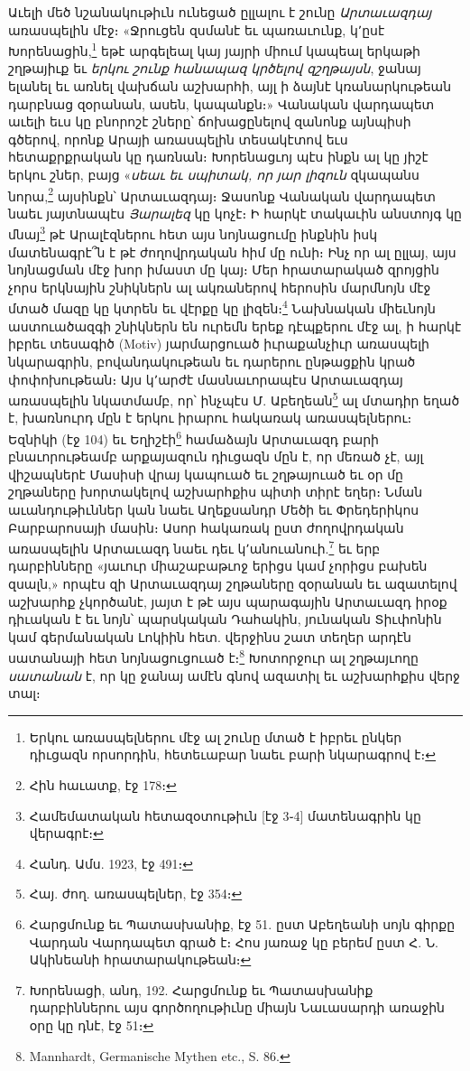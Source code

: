 \documentclass{article}
\begin{document}
{Աւելի մեծ նշանակութիւն ունեցած ըլլալու է շունը \emph{Արտաւազդայ} առասպելին մէջ։ «Ջրուցեն զսմանէ եւ պառաւունք, կ՚ըսէ Խորենացին,\footnote{Երկու առասպելներու մէջ ալ շունը մտած է իբրեւ ընկեր դիւցազն որսորդին, հետեւաբար նաեւ բարի նկարագրով է։} եթէ արգելեալ կայ յայրի միում կապեալ երկաթի շղթայիւք եւ \emph{երկու շունք հանապազ կրծելով զշղթայսն}, ջանայ ելանել եւ առնել վախճան աշխարհի, այլ ի ձայնէ կռանարկութեան դարբնաց զօրանան, ասեն, կապանքն։» Վանական վարդապետ աւելի եւս կը բնորոշէ շները՝ ճոխացընելով զանոնք այնպիսի գծերով, որոնք Արայի առասպելին տեսակէտով եւս հետաքրքրական կը դառնան։ Խորենացւոյ պէս ինքն ալ կը յիշէ երկու շներ, բայց «\emph{սեաւ եւ սպիտակ, որ յար լիզուն} զկապանս նորա,\footnote{Հին հաւատք, էջ 178։} այսինքն՝ Արտաւազդայ։ Ջասոնք Վանական վարդապետ նաեւ յայտնապէս \emph{Յարալեզ} կը կոչէ։ Ի հարկէ տակաւին անստոյգ կը մնայ\footnote{Համեմատական հետազօտութիւն [էջ 3֊4] մատենագրին կը վերագրէ։} թէ Արալէզներու հետ այս նոյնացումը ինքնին իսկ մատենագրէ՞ն է թէ ժողովրդական հիմ մը ունի։ Ինչ որ ալ ըլլայ, այս նոյնացման մէջ խոր իմաստ մը կայ։ Մեր հրատարակած զրոյցին չորս երկնային շնիկներն ալ ակռաներով հերոսին մարմնոյն մէջ մտած մազը կը կտրեն եւ վէրքը կը լիզեն։\footnote{Հանդ. Ամս. 1923, էջ 491։} Նախնական միեւնոյն աստուածազգի շնիկներն են ուրեմն երեք դէպքերու մէջ ալ, ի հարկէ իբրեւ տեսագիծ (Motiv) յարմարցուած իւրաքանչիւր առասպելի նկարագրին, բովանդակութեան եւ դարերու ընթացքին կրած փոփոխութեան։ Այս կ՚արժէ մասնաւորապէս Արտաւազդայ առասպելին նկատմամբ, որ՝ ինչպէս Մ. Աբեղեան\footnote{Հայ. ժող. առասպելներ, էջ 354։} ալ մտադիր եղած է, խառնուրդ մըն է երկու իրարու հակառակ առասպելներու։ Եզնիկի (էջ 104) եւ Եղիշէի\footnote{Հարցմունք եւ Պատասխանիք, էջ 51. ըստ Աբեղեանի սոյն գիրքը Վարդան Վարդապետ գրած է։ Հոս յառաջ կը բերեմ ըստ Հ. Ն. Ակինեանի հրատարակութեան։} համաձայն Արտաւազդ բարի բնաւորութեամբ արքայազուն դիւցազն մըն է, որ մեռած չէ, այլ վիշապներէ Մասիսի վրայ կապուած եւ շղթայուած եւ օր մը շղթաները խորտակելով աշխարհքիս պիտի տիրէ եղեր։ Նման աւանդութիւններ կան նաեւ Աղեքսանդր Մեծի եւ Փրեդերիկոս Բարբարոսայի մասին։ Ասոր հակառակ ըստ ժողովրդական առասպելին Արտաւազդ նաեւ դեւ կ՚անուանուի.\footnote{Խորենացի, անդ, 192. Հարցմունք եւ Պատասխանիք դարբիններու այս գործողութիւնը միայն Նաւասարդի առաջին օրը կը դնէ, էջ 51։} եւ երբ դարբինները «յաւուր միաշաբաթւոջ երիցս կամ չորիցս բախեն զսալն,» որպէս զի Արտաւազդայ շղթաները զօրանան եւ ազատելով աշխարհք չկործանէ, յայտ է թէ այս պարագային Արտաւազդ իրօք դիւական է եւ նոյն՝ պարսկական Դահակին, յունական Տիւփոնին կամ գերմանական Լոկիին հետ. վերջինս շատ տեղեր արդէն սատանայի հետ նոյնացուցուած է։\footnote{Mannhardt, Germanische Mythen etc., S. 86.} Խոտորջուր ալ շղթայւողը \emph{սատանան} է, որ կը ջանայ ամէն գնով ազատիլ եւ աշխարհքիս վերջ տալ։

}
\end{document}
